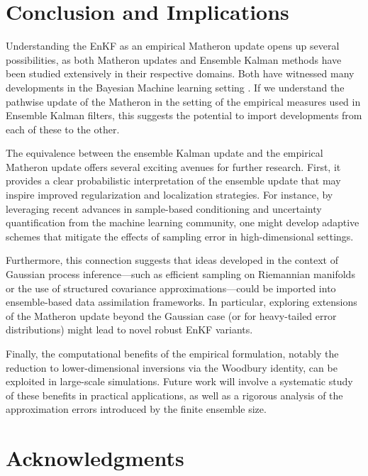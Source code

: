 \documentclass[wcp]{jmlr} %
\begin{document}
\section{Conclusion and Implications}

Understanding the EnKF as an empirical Matheron update opens up several possibilities, as both Matheron updates and Ensemble Kalman methods have been studied extensively in their respective domains.
Both have witnessed many developments in the Bayesian Machine learning setting
\citep{Alzraiee2022Scalable,Chada2022Convergence,Chen2021Autodifferentiable,Chen2023Reducedorder,Dunbar2022Ensemble,Guth2020Ensemble,Huang2022Iterated,Kovachki2019Ensemble,MacKinlay2025Gaussian,Oliver2022Hybrid,Schillings2017Analysis,Schneider2022Ensemble,Spantini2022Coupling}.
If we understand the pathwise update of the Matheron in the setting of the empirical measures used in Ensemble Kalman filters, this suggests the potential to import developments from each of these to the other.

The equivalence between the ensemble Kalman update and the empirical Matheron update offers several exciting avenues for further research. First, it provides a clear probabilistic interpretation of the ensemble update that may inspire improved regularization and localization strategies. For instance, by leveraging recent advances in sample-based conditioning and uncertainty quantification from the machine learning community, one might develop adaptive schemes that mitigate the effects of sampling error in high-dimensional settings.

Furthermore, this connection suggests that ideas developed in the context of Gaussian process inference—such as efficient sampling on Riemannian manifolds or the use of structured covariance approximations—could be imported into ensemble-based data assimilation frameworks. In particular, exploring extensions of the Matheron update beyond the Gaussian case (or for heavy-tailed error distributions) might lead to novel robust EnKF variants.

Finally, the computational benefits of the empirical formulation, notably the reduction to lower-dimensional inversions via the Woodbury identity, can be exploited in large-scale simulations. Future work will involve a systematic study of these benefits in practical applications, as well as a rigorous analysis of the approximation errors introduced by the finite ensemble size.

\section*{Acknowledgments}
\end{document}
